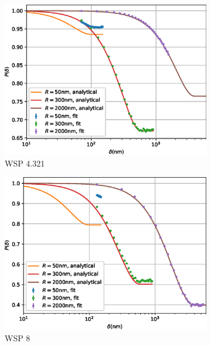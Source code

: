 \documentclass{article}
\begin{document}
\begin{figure}[p]
\begin{subfigure}[b]{0.45\textwidth}
		\includegraphics[width=\textwidth]{simulation-plot-rms-WSP-4.321}
		\caption{WSP 4.321}
		\label{fig:simulation-plot-rms-WSP-4.321}
	\end{subfigure}
	\hfill
	\begin{subfigure}[b]{0.45\textwidth}
		\centering
		\includegraphics[width=\textwidth]{simulation-plot-rms-WSP-8}
		\caption{WSP 8}
		\label{fig:simulation-plot-rms-WSP-8}
	\end{subfigure}
	\centering
	\begin{subfigure}[b]{0.45\textwidth}
		\centering

\end{subfigure}
\end{figure}
\end{document}
